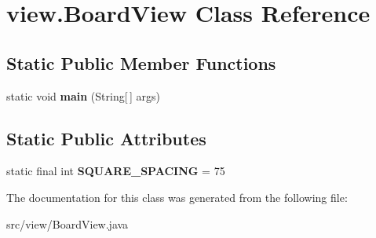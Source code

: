 \hypertarget{classview_1_1_board_view}{\section{view.\-Board\-View Class Reference}
\label{classview_1_1_board_view}
}
\subsection*{Static Public Member Functions}
\begin{DoxyCompactItemize}
\item 
\hypertarget{classview_1_1_board_view_a267f383240409ac8f774caf6337c083b}{static void {\bfseries main} (String\mbox{[}$\,$\mbox{]} args)}\label{classview_1_1_board_view_a267f383240409ac8f774caf6337c083b}

\end{DoxyCompactItemize}
\subsection*{Static Public Attributes}
\begin{DoxyCompactItemize}
\item 
\hypertarget{classview_1_1_board_view_ab14d3084c259f4a2b4cbd47f522068dc}{static final int {\bfseries S\-Q\-U\-A\-R\-E\-\_\-\-S\-P\-A\-C\-I\-N\-G} = 75}\label{classview_1_1_board_view_ab14d3084c259f4a2b4cbd47f522068dc}

\end{DoxyCompactItemize}


The documentation for this class was generated from the following file\-:\begin{DoxyCompactItemize}
\item 
src/view/Board\-View.\-java\end{DoxyCompactItemize}

